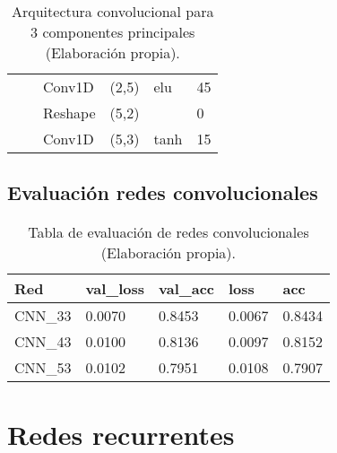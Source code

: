 \begin{table}[H]
\begin{center}
\begin{tabular}{ll|l|l|l|l|}
\multicolumn{1}{|l|}{}                                                                  &                                   & Conv1D                             & (2,5)                                & elu                                     & 45                                          \\ \cline{3-6} 
\multicolumn{1}{|l|}{}                                                                  &                                   & Reshape                            & (5,2)                                &                                          & 0                                           \\ \cline{3-6} 
\multicolumn{1}{|l|}{}                                                                  &                                   & Conv1D                             & (5,3)                                & tanh                                     & 15                                          \\ \hline
\end{tabular}

\end{center}
\caption{Arquitectura convolucional para 3 componentes principales (Elaboraci\'{o}n propia).}
\label{table:cnn_3}
\end{table}

\subsection{Evaluaci\'{o}n redes convolucionales}

\begin{table}[H]
\centering
\begin{tabular}{|l|l|l|l|l|}
\hline
\textbf{Red} & \textbf{val\_loss} & \textbf{val\_acc} & \textbf{loss} & \textbf{acc} \\ \hline
CNN\_33 & 0.0070 & 0.8453 & 0.0067 & 0.8434 \\ \hline
CNN\_43 & 0.0100 & 0.8136 & 0.0097 & 0.8152 \\ \hline
CNN\_53 & 0.0102 & 0.7951 & 0.0108 & 0.7907 \\ \hline
\end{tabular}
\caption{Tabla de evaluaci\'{o}n de redes convolucionales (Elaboraci\'{o}n propia).}
\label{table:evaluacion_cnn}
\end{table}

\section{Redes recurrentes}


